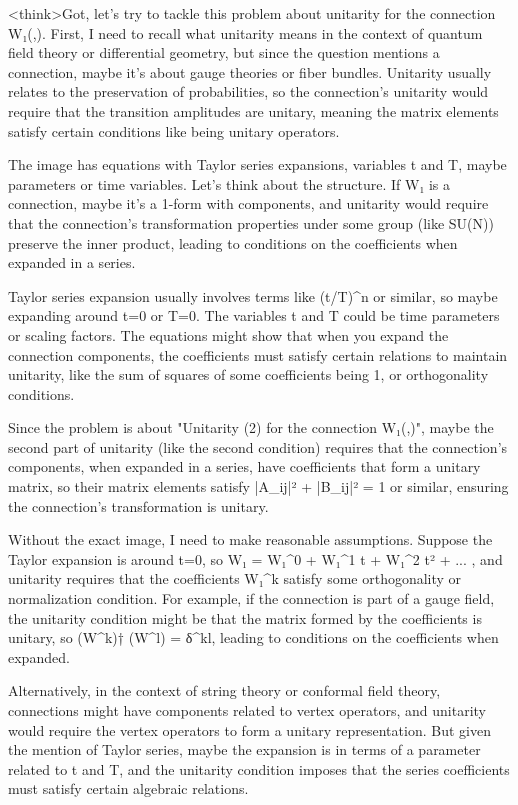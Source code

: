 <think>Got, let's try to tackle this problem about unitarity for the connection W₁(,). First, I need to recall what unitarity means in the context of quantum field theory or differential geometry, but since the question mentions a connection, maybe it's about gauge theories or fiber bundles. Unitarity usually relates to the preservation of probabilities, so the connection's unitarity would require that the transition amplitudes are unitary, meaning the matrix elements satisfy certain conditions like being unitary operators.

The image has equations with Taylor series expansions, variables t and T, maybe parameters or time variables. Let's think about the structure. If W₁ is a connection, maybe it's a 1-form with components, and unitarity would require that the connection's transformation properties under some group (like SU(N)) preserve the inner product, leading to conditions on the coefficients when expanded in a series.

Taylor series expansion usually involves terms like (t/T)^n or similar, so maybe expanding around t=0 or T=0. The variables t and T could be time parameters or scaling factors. The equations might show that when you expand the connection components, the coefficients must satisfy certain relations to maintain unitarity, like the sum of squares of some coefficients being 1, or orthogonality conditions.

Since the problem is about "Unitarity (2) for the connection W₁(,)", maybe the second part of unitarity (like the second condition) requires that the connection's components, when expanded in a series, have coefficients that form a unitary matrix, so their matrix elements satisfy |A_ij|² + |B_ij|² = 1 or similar, ensuring the connection's transformation is unitary.

Without the exact image, I need to make reasonable assumptions. Suppose the Taylor expansion is around t=0, so W₁ = W₁^0 + W₁^1 t + W₁^2 t² + ... , and unitarity requires that the coefficients W₁^k satisfy some orthogonality or normalization condition. For example, if the connection is part of a gauge field, the unitarity condition might be that the matrix formed by the coefficients is unitary, so (W^k)† (W^l) = δ^kl, leading to conditions on the coefficients when expanded.

Alternatively, in the context of string theory or conformal field theory, connections might have components related to vertex operators, and unitarity would require the vertex operators to form a unitary representation. But given the mention of Taylor series, maybe the expansion is in terms of a parameter related to t and T, and the unitarity condition imposes that the series coefficients must satisfy certain algebraic relations.


